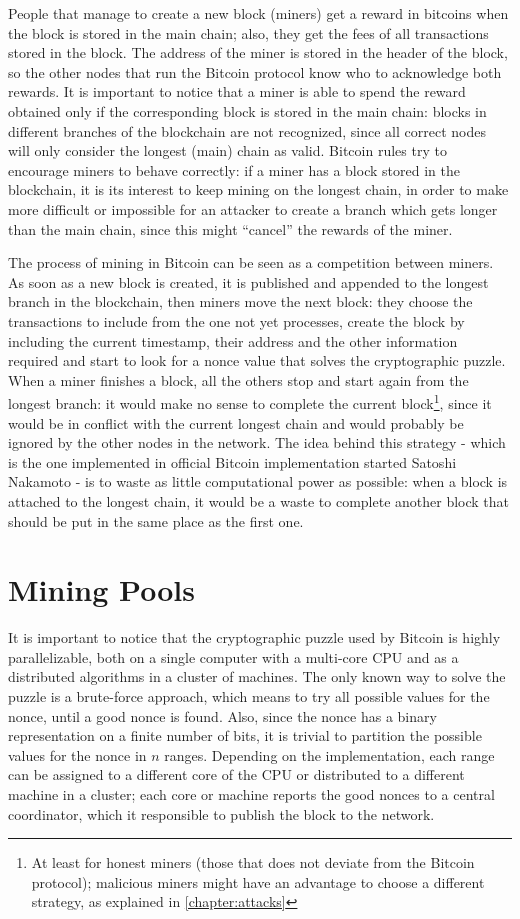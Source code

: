 \bigskip
People that manage to create a new block (miners) get a reward in bitcoins when the block is stored in the main chain;
also, they get the fees of all transactions stored in the block.
The address of the miner is stored in the header of the block, so the other nodes that run the Bitcoin protocol know who to acknowledge both rewards.
It is important to notice that a miner is able to spend the reward obtained only if the corresponding block is stored in the main chain:
blocks in different branches of the blockchain are not recognized, since all correct nodes will only consider the longest (main) chain as valid.
Bitcoin rules try to encourage miners to behave correctly:
if a miner has a block stored in the blockchain, it is its interest to keep mining on the longest chain, in order to make more difficult or impossible for an attacker to create a branch which gets longer than the main chain, since this might ``cancel'' the rewards of the miner.

\bigskip
The process of mining in Bitcoin can be seen as a competition between miners.
As soon as a new block is created, it is published and appended to the longest branch in the blockchain, then miners move the next block:
they choose the transactions to include from the one not yet processes, create the block by including the current timestamp, their address and the other information required and start to look for a nonce value that solves the cryptographic puzzle.
When a miner finishes a block, all the others stop and start again from the longest branch:
it would make no sense to complete the current block\footnote{At least for honest miners (those that does not deviate from the Bitcoin protocol); malicious miners might have an advantage to choose a different strategy, as explained in \cref{chapter:attacks}}, since it would be in conflict with the current longest chain and would probably be ignored by the other nodes in the network.
The idea behind this strategy - which is the one implemented in official Bitcoin implementation started Satoshi Nakamoto \cite{bitcoin_github} - is to waste as little computational power as possible:
when a block is attached to the longest chain, it would be a waste to complete another block that should be put in the same place as the first one.

\section{Mining Pools}
It is important to notice that the cryptographic puzzle used by Bitcoin is highly parallelizable, both on a single computer with a multi-core \ac{CPU} and as a distributed algorithms in a cluster of machines.
The only known way to solve the puzzle is a brute-force approach, which means to try all possible values for the nonce, until a good nonce is found.
Also, since the nonce has a binary representation on a finite number of bits, it is trivial to partition the possible values for the nonce in $n$ ranges.
Depending on the implementation, each range can be assigned to a different core of the \ac{CPU} or distributed to a different machine in a cluster;
each core or machine reports the good nonces to a central coordinator, which it responsible to publish the block to the network.

